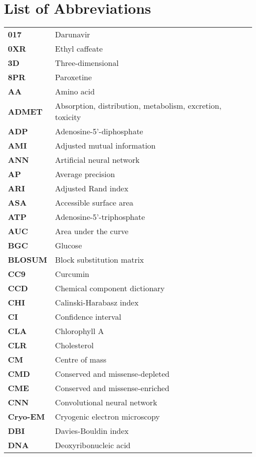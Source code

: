 \chapter*{List of Abbreviations}

\begin{longtable}[l]{@{}p{2.5cm}p{12cm}@{}}
\textbf{017} & Darunavir \\
\textbf{0XR} & Ethyl caffeate \\
\textbf{3D} & Three-dimensional \\
\textbf{8PR} & Paroxetine \\
\textbf{AA} & Amino acid \\
\textbf{ADMET} & Absorption, distribution, metabolism, excretion, toxicity \\
\textbf{ADP} & Adenosine-5'-diphosphate \\
\textbf{AMI} & Adjusted mutual information \\
\textbf{ANN} & Artificial neural network \\
\textbf{AP} & Average precision \\
\textbf{ARI} & Adjusted Rand index \\
\textbf{ASA} & Accessible surface area \\
\textbf{ATP} & Adenosine-5’-triphosphate \\
\textbf{AUC} & Area under the curve \\
\textbf{BGC} & Glucose \\
\textbf{BLOSUM} & Block substitution matrix \\
\textbf{CC9} & Curcumin \\
\textbf{CCD} & Chemical component dictionary \\
\textbf{CHI} & Calinski-Harabasz index \\
\textbf{CI} & Confidence interval \\
\textbf{CLA} & Chlorophyll A \\
\textbf{CLR} & Cholesterol \\
\textbf{CM} & Centre of mass \\
\textbf{CMD} & Conserved and missense-depleted \\
\textbf{CME} & Conserved and missense-enriched \\
\textbf{CNN} & Convolutional neural network \\
\textbf{Cryo-EM} & Cryogenic electron microscopy \\
\textbf{DBI} & Davies-Bouldin index \\
\textbf{DNA} & Deoxyribonucleic acid \\

\end{longtable}
